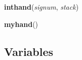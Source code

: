     \label{words:inthand}

    \vspace{0.5ex}

    \begin{boxedminipage}{\textwidth}

    \raggedright \textbf{inthand}(\textit{signum}, \textit{stack})

    \end{boxedminipage}

    \label{words:myhand}

    \vspace{0.5ex}

    \begin{boxedminipage}{\textwidth}

    \raggedright \textbf{myhand}()

    \end{boxedminipage}



  \subsection{Variables}

